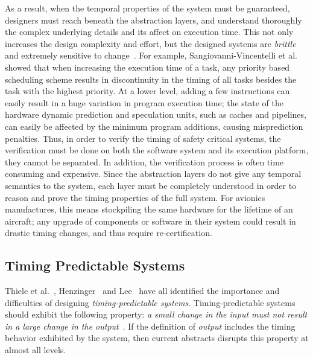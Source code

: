 As a result, when the temporal properties of the system must be guaranteed, designers must reach beneath the abstraction layers, and understand thoroughly the complex underlying details and its affect on execution time. 
This not only increases the design complexity and effort, but the designed systems are \emph{brittle} and extremely sensitive to change~\cite{Sangiovanni-Vincentelli2007automotive, Edwards2007PRETcase}.  
For example, Sangiovanni-Vincentelli et al.\cite{Sangiovanni-Vincentelli2007automotive} showed that when increasing the execution time of a task, any priority based scheduling scheme results in discontinuity in the timing of all tasks besides the task with the highest priority. 
At a lower level, adding a few instructions can easily result in a huge variation in program execution time; the state of the hardware dynamic prediction and speculation units, such as caches and pipelines, can easily be affected by the minimum program additions, causing misprediction penalties.
Thus, in order to verify the timing of safety critical systems, the verification must be done on both the software system and its execution platform, they cannot be separated. 
In addition, the verification process is often time consuming and expensive.
Since the abstraction layers do not give any temporal semantics to the system, each layer must be completely understood in order to reason and prove the timing properties of the full system.  
For avionics manufactures, this means stockpiling the same hardware for the lifetime of an aircraft; any upgrade of components or software in their system could result in drastic timing changes, and thus require re-certification.


\subsection{Timing Predictable Systems}
Thiele et al.~\cite{thiele_et_al:DSP:2004:2}, Henzinger~\cite{Henzinger2008} and Lee~\cite{LeeOnTime2005} have all identified the importance and difficulties of designing \emph{timing-predictable systems}.
Timing-predictable systems should exhibit the following property: \textit{a small change in the input must not result in a large change in the output}~\cite{Henzinger2008}.
If the definition of \emph{output} includes the timing behavior exhibited by the system, then current abstracts disrupts this property at almost all levels. 

